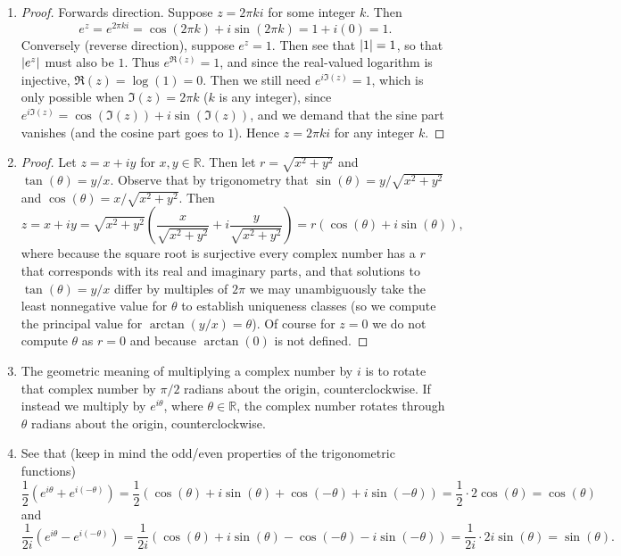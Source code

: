 \documentclass[11pt]{article}
\newcommand{\br}[1]{\left(#1\right)}
\begin{document}
\begin{enumerate}[label=(\alph*)]
  \item \begin{proof}
    Forwards direction. Suppose $z = 2\pi k i$ for some integer $k$. Then \[e^z = e^{2\pi k i} = \cos(2\pi k) + i\sin(2\pi k) = 1 + i(0) = 1.\] Conversely (reverse direction), suppose $e^z = 1$. Then see that $\abs{1} = 1$, so that $\abs{e^z}$ must also be $1$. Thus $e^{\Re(z)} = 1$, and since the real-valued logarithm is injective, $\Re(z) = \log(1) = 0$. Then we still need $e^{i\Im(z)} = 1$, which is only possible when $\Im(z) = 2\pi k$ ($k$ is any integer), since $e^{i\Im(z)} = \cos(\Im(z)) + i\sin(\Im(z))$, and we demand that the sine part vanishes (and the cosine part goes to $1$). Hence $z = 2\pi k i$ for any integer $k$.
  \end{proof}

  \item \begin{proof}
    Let $z = x+iy$ for $x,y\in \mathbb{R}$. Then let $r = \sqrt{x^2+y^2}$ and $\tan(\theta) = y/x$. Observe that by trigonometry that $\sin(\theta) = y/\sqrt{x^2+y^2}$ and $\cos(\theta) = x/\sqrt{x^2+y^2}$. Then \[z = x+iy = \sqrt{x^2+y^2}\br{\frac{x}{\sqrt{x^2+y^2}} + i\frac{y}{\sqrt{x^2+y^2}}} = r\br{\cos(\theta) + i\sin(\theta)},\] where because the square root is surjective every complex number has a $r$ that corresponds with its real and imaginary parts, and that solutions to $\tan(\theta) = y/x$ differ by multiples of $2\pi$ we may unambiguously take the least nonnegative value for $\theta$ to establish uniqueness classes (so we compute the principal value for $\arctan(y/x) = \theta$). Of course for $z=0$ we do not compute $\theta$ as $r=0$ and because $\arctan(0)$ is not defined.
  \end{proof}

  \item The geometric meaning of multiplying a complex number by $i$ is to rotate that complex number by $\pi/2$ radians about the origin, counterclockwise. If instead we multiply by $e^{i\theta}$, where $\theta \in \mathbb{R}$, the complex number rotates through $\theta$ radians about the origin, counterclockwise.
  
  \item See that (keep in mind the odd/even properties of the trigonometric functions) \[\frac{1}{2}\br{e^{i\theta} + e^{i(-\theta)}} = \frac{1}{2}\br{\cos(\theta)+i\sin(\theta) + \cos(-\theta)+i\sin(-\theta)} = \frac{1}{2}\cdot 2\cos(\theta) = \cos(\theta)\] and \[\frac{1}{2i}\br{e^{i\theta} - e^{i(-\theta)}} = \frac{1}{2i}\br{\cos(\theta)+i\sin(\theta)-\cos(-\theta)-i\sin(-\theta)} = \frac{1}{2i}\cdot 2i\sin(\theta) = \sin(\theta).\]


\end{enumerate}
\end{document}
